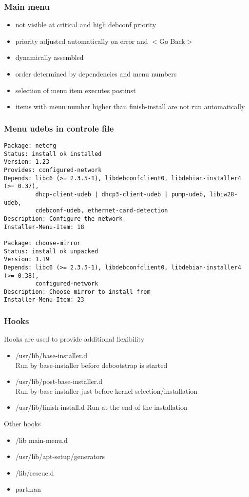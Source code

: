 \documentclass{beamer}
\begin{document}
\begin{frame}
  \frametitle{Main menu}
	\begin{itemize}
	\item
		not visible at critical and high debconf priority
	\item
		priority adjusted automatically on error and $<$Go Back$>$
	\item
		dynamically assembled
	\item
		order determined by dependencies and menu numbers
	\item
		selection of menu item executes postinst
	\item
		items with menu number higher than finish-install are not run automatically
	\end{itemize}
\end{frame}

\begin{frame}[fragile]
  \frametitle{Menu udebs in controle file}
\begin{tiny}
\begin{verbatim}
Package: netcfg
Status: install ok installed
Version: 1.23
Provides: configured-network
Depends: libc6 (>= 2.3.5-1), libdebconfclient0, libdebian-installer4 (>= 0.37),
         dhcp-client-udeb | dhcp3-client-udeb | pump-udeb, libiw28-udeb,
         cdebconf-udeb, ethernet-card-detection
Description: Configure the network
Installer-Menu-Item: 18

Package: choose-mirror
Status: install ok unpacked
Version: 1.19
Depends: libc6 (>= 2.3.5-1), libdebconfclient0, libdebian-installer4 (>= 0.38),
         configured-network
Description: Choose mirror to install from
Installer-Menu-Item: 23
\end{verbatim}
\end{tiny}
\end{frame}

\begin{frame}
  \frametitle{Hooks}
	Hooks are used to provide additional flexibility
	\begin{itemize}
	\item /usr/lib/base-installer.d \\
		Run by base-installer before debootstrap is started
	\item /usr/lib/post-base-installer.d \\
		Run by base-installer just before kernel selection/installation
	\item /usr/lib/finish-install.d
		Run at the end of the installation
	\end{itemize}

	Other hooks
	\begin{itemize}
	\item /lib main-menu.d
	\item /usr/lib/apt-setup/generators
	\item /lib/rescue.d
	\item partman
	\end{itemize}
\end{frame}
\end{document}
